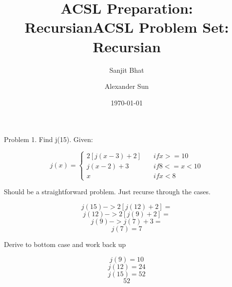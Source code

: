 \documentclass{article}
\title{ACSL Preparation: Recursian}
\author{Sanjit Bhat \and Alexander Sun}
\date{\today}
\begin{document}
\maketitle

\newpage

\begin{center}
    \title{ACSL Problem Set: Recursian}
\end{center}

Problem 1. Find j(15). Given:


$$
j(x) = \left\{
        \begin{array}{ll}
            2[j(x-3) + 2] & \quad if x >= 10 \\
            j(x-2) + 3 & \quad if 8 <= x < 10 \\
            x & \quad if x < 8
        \end{array}
    \right.
$$

Should be a straightforward problem. Just recurse through the cases.

\[j(15) -> 2[j(12) + 2] = \]
\[j(12) -> 2[j(9) + 2] = \]
\[j(9) -> j(7) + 3 = \]
\[j(7)  = 7\]
\begin{center}
    Derive to bottom case and work back up
\end{center}
\[j(9)  = 10\]
\[j(12)  = 24\]
\[j(15)  = 52\]
\[52\]
\end{document}
